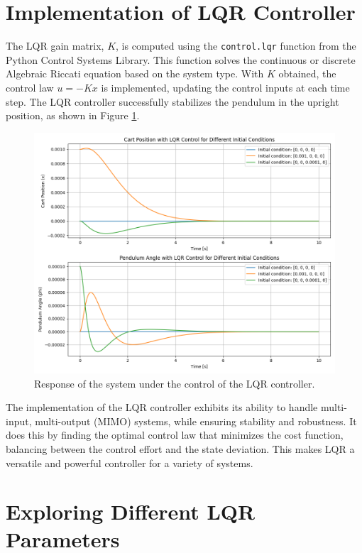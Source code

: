 \documentclass[11pt,twocolumn,twoside,lineno]{pnas-new}
\begin{document}
\section{Implementation of LQR Controller}

The LQR gain matrix, $K$, is computed using the \texttt{control.lqr} function from the Python Control Systems Library. This function solves the continuous or discrete Algebraic Riccati equation based on the system type. With $K$ obtained, the control law $u = -Kx$ is implemented, updating the control inputs at each time step. The LQR controller successfully stabilizes the pendulum in the upright position, as shown in Figure \ref{fig:lqr_response}.

\begin{figure}[h]
\centering
\includegraphics[width=\linewidth]{simulations/lqr_response.png}
\caption{Response of the system under the control of the LQR controller.}
\label{fig:lqr_response}
\end{figure}

The implementation of the LQR controller exhibits its ability to handle multi-input, multi-output (MIMO) systems, while ensuring stability and robustness. It does this by finding the optimal control law that minimizes the cost function, balancing between the control effort and the state deviation. This makes LQR a versatile and powerful controller for a variety of systems.

\section{Exploring Different LQR Parameters}
\end{document}
